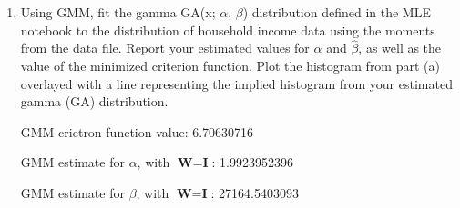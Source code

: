 \documentclass[letterpaper,12pt]{article}
\theoremstyle{definition}
\begin{document}
\begin{enumerate}
\begin{enumerate}
\item Using GMM, fit the gamma GA(x; $\alpha$, $\beta$) distribution defined in the MLE notebook to the distribution of household income data using the moments from the data file. Report your estimated values for $\hat{\alpha}$  and  $\hat{\beta}$, as well as the value of the minimized criterion function. Plot the histogram from part (a) overlayed with a line representing the implied histogram from your estimated gamma (GA) distribution.
\par
\begin{figure}[H]\centering\captionsetup{width=4.0in}
\end{figure}
\par
GMM crietron function value: 6.70630716\par
GMM estimate for $\alpha$, with  $\textbf{W} = \textbf{I}$: 1.9923952396 \par
GMM estimate for $\beta$, with $\textbf{W} = \textbf{I}$: 27164.5403093\par
\bigskip


\end{enumerate}
\end{enumerate}
\end{document}
